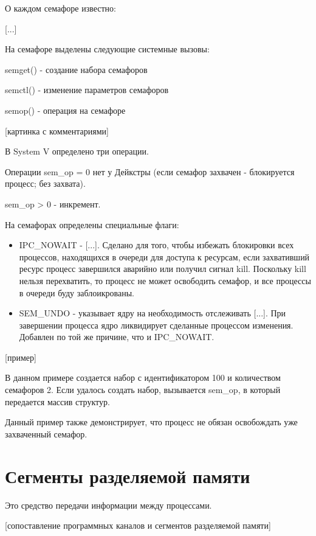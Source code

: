 \documentclass[a4paper, 12pt]{report}
\begin{document}
	О каждом семафоре известно:
	
		[...]

	На семафоре выделены следующие системные вызовы:
	
	semget() - создание набора семафоров
	
	semctl() - изменение параметров семафоров
	
	semop() - операция на семафоре
	
	[картинка с комментариями]
	
	В System V определено три операции.
	
	Операции sem\_op = 0 нет у Дейкстры (если семафор захвачен - блокируется процесс; без захвата).
	
	sem\_op > 0 - инкремент.
	
	На семафорах определены специальные флаги:
	
	\begin{itemize}
		\item IPC\_NOWAIT - [...]. Сделано для того, чтобы избежать блокировки всех процессов, находящихся в очереди для доступа к ресурсам, если захвативший ресурс процесс завершился аварийно или получил сигнал kill. Поскольку kill нельзя перехватить, то процесс не может освободить семафор, и все процессы в очереди буду заблоикрованы.
		
		\item SEM\_UNDO - указывает ядру на необходимость отслеживать [...]. При завершении процесса ядро ликвидирует сделанные процессом изменения. Добавлен по той же причине, что и IPC\_NOWAIT.
	\end{itemize}

	[пример]
	
	В данном примере создается набор с идентификатором 100 и количеством семафоров 2. Если удалось создать набор, вызывается sem\_op, в который передается массив структур.
	
	Данный пример также демонстрирует, что процесс не обязан освобождать уже захваченный семафор.
	
	\section*{Сегменты разделяемой памяти}
	
	Это средство передачи информации между процессами.
	
	[сопоставление программных каналов и сегментов разделяемой памяти]
	
\end{document}
